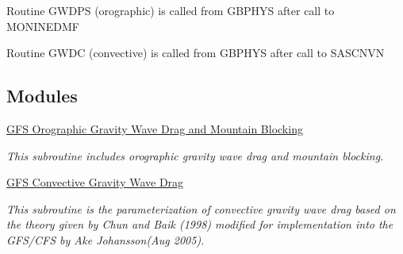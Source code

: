 \begin{DoxyItemize}
\item Routine G\+W\+D\+PS (orographic) is called from G\+B\+P\+H\+YS after call to M\+O\+N\+I\+N\+E\+D\+MF
\item Routine G\+W\+DC (convective) is called from G\+B\+P\+H\+YS after call to S\+A\+S\+C\+N\+VN 
\end{DoxyItemize}\subsection*{Modules}
\begin{DoxyCompactItemize}
\item 
\hyperlink{group___g_f_s__ogwd}{G\+F\+S Orographic Gravity Wave Drag and Mountain Blocking}
\begin{DoxyCompactList}\small\item\em This subroutine includes orographic gravity wave drag and mountain blocking. \end{DoxyCompactList}\item 
\hyperlink{group___g_f_s__cgwd}{G\+F\+S Convective Gravity Wave Drag}
\begin{DoxyCompactList}\small\item\em This subroutine is the parameterization of convective gravity wave drag based on the theory given by Chun and Baik (1998) \cite{chun_and_baik_1998} modified for implementation into the G\+F\+S/\+C\+FS by Ake Johansson(\+Aug 2005). \end{DoxyCompactList}\end{DoxyCompactItemize}
